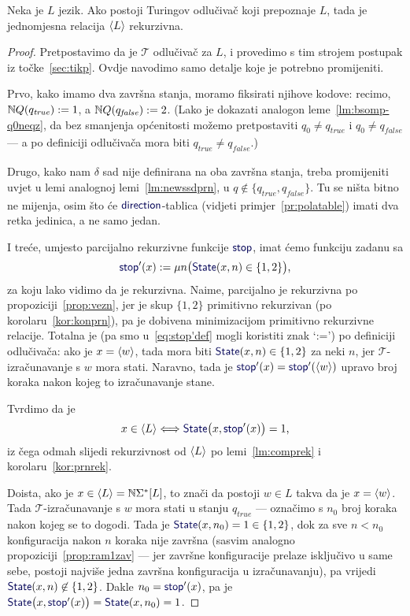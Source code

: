 \begin{teorem}\label{tm:oikr}
Neka je $L$ jezik. Ako postoji Turingov odlučivač koji prepoznaje $L$, tada je jednomjesna relacija $\langle L\rangle$ rekurzivna.
\end{teorem}
\begin{proof}
Pretpostavimo da je $\mathcal T$ odlučivač za $L$, i provedimo s tim strojem postupak iz točke~\ref{sec:tikp}. Ovdje navodimo samo detalje koje je potrebno promijeniti.

Prvo, kako imamo dva završna stanja, moramo fiksirati njihove kodove: recimo, ${\mathbb N} Q(q_\mathit{true}):=1$, a ${\mathbb N} Q(q_\mathit{false}):=2$. (Lako je dokazati analogon leme~\ref{lm:bsomp-q0neqz}, da bez smanjenja općenitosti možemo pretpostaviti $q_0\not=q_\mathit{true}$ i $q_0\not=q_\mathit{false}$ --- a po definiciji odlučivača mora biti $q_\mathit{true}\not=q_\mathit{false}$.)

    Drugo, kako nam $\delta$ sad nije definirana na oba završna stanja, treba promijeniti uvjet u lemi analognoj lemi~\ref{lm:newssdprn}, u $q\not\in\{q_\mathit{true},q_\mathit{false}\}$. Tu se ništa bitno ne mijenja, osim što će $\f{direction}$-tablica (vidjeti primjer~\ref{pr:polatable}) imati dva retka jedinica, a ne samo jedan.

I treće, umjesto parcijalno rekurzivne funkcije $\f{stop}$, imat ćemo funkciju zadanu sa
\begin{equation}\label{eq:stop'def}
    \f{stop}'(x):=\mu n\bigl(\f{State}(x,n)\in\{1,2\}\bigr)\text,
\end{equation}
za koju lako vidimo da je rekurzivna. Naime, parcijalno je rekurzivna po propoziciji~\ref{prop:vezn}, jer je skup $\{1,2\}$ primitivno rekurzivan (po korolaru~\ref{kor:konprn}), pa je dobivena minimizacijom primitivno rekurzivne relacije. Totalna je (pa smo u~\eqref{eq:stop'def} mogli koristiti znak `:=') po definiciji odlučivača: ako je $x=\langle w\rangle$, tada mora biti $\f{State}(x,n)\in\{1,2\}$ za neki $n$, jer $\mathcal T$-izračunavanje s $w$ mora stati.
Naravno, tada je $\f{stop}'(x)=\f{stop}'(\kr w)$ upravo broj koraka nakon kojeg to iz\-ra\-ču\-na\-va\-nje stane.

Tvrdimo da je
\begin{equation}
    x\in\kr L\Longleftrightarrow\f{State}\bigl(x,\f{stop}'(x)\bigr)=1\text,
\end{equation}
iz čega odmah slijedi rekurzivnost od $\langle L\rangle$ po lemi~\ref{lm:comprek} i korolaru~\ref{kor:prnrek}. 

Doista, ako je $x\in\langle L\rangle={\mathbb N}\Sigma^*[L]$, to znači da postoji $w\in L$ takva da je $x=\langle w\rangle$. Tada $\mathcal T$-izračunavanje s $w$ mora stati u stanju $q_\mathit{true}$ --- označimo s $n_0$ broj koraka nakon kojeg se to dogodi. Tada je $\f{State}(x,n_0)=1\in\{1,2\}$, dok za sve $n<n_0$ konfiguracija nakon $n$ koraka nije završna (sasvim analogno propoziciji~\ref{prop:ram1zav} --- jer završne konfiguracije prelaze isključivo u same sebe, postoji najviše jedna završna konfiguracija u izračunavanju), pa vrijedi $\f{State}(x,n)\not\in\{1,2\}$. Dakle $n_0=\f{stop}'(x)$, pa je $\f{State}\bigl(x,\f{stop}'(x)\bigr)=\f{State}(x,n_0)=1$.


\end{proof}
